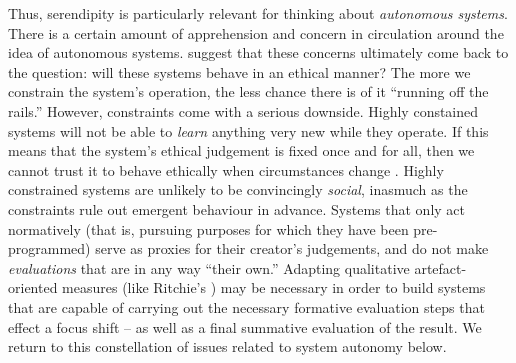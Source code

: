  Thus, serendipity is particularly relevant for thinking about
\emph{autonomous systems}.  There is a certain amount of apprehension
and concern in circulation around the idea of autonomous systems.
 suggest that these concerns ultimately
come back to the question: will these systems behave in an ethical
manner?  The more we constrain the system's operation, the less chance
there is of it ``running off the rails.''  However, constraints come
with a serious downside.  Highly constained systems will not be able
to \emph{learn} anything very new while they operate.  If this means
that the system's ethical judgement is fixed once and for all, then we
cannot trust it to behave ethically when circumstances change
\cite{powers2005deontological}.  Highly constrained systems are
unlikely to be convincingly \emph{social}, inasmuch as the constraints
rule out emergent behaviour in advance.  Systems that only act
normatively (that is, pursuing purposes for which they have been
pre-programmed) serve as proxies for their creator's judgements, and
do not make \emph{evaluations} that are in any way ``their own.''
Adapting qualitative artefact-oriented measures (like Ritchie's
\cite{ritchie07}) may be necessary in order to build systems
that are capable of carrying out the necessary formative evaluation
steps that effect a focus shift -- as well as a final summative
evaluation of the result.  We return to this constellation of issues
related to system autonomy below.

%



